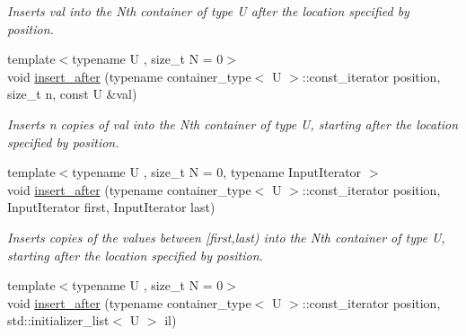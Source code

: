 \begin{DoxyCompactItemize}
\begin{DoxyCompactList}\small\item\em Inserts val into the Nth container of type U after the location specified by position. \end{DoxyCompactList}\item 
\hypertarget{classheterogeneous_1_1heteroforward__list_3_01_t_00_01_types_8_8_8_4_ae4b891f6c1e191cc7dd586497b12f716}{}{\footnotesize template$<$typename U , size\+\_\+t N = 0$>$ }\\void \hyperlink{classheterogeneous_1_1heteroforward__list_3_01_t_00_01_types_8_8_8_4_ae4b891f6c1e191cc7dd586497b12f716}{insert\+\_\+after} (typename container\+\_\+type$<$ U $>$\+::const\+\_\+iterator position, size\+\_\+t n, const U \&val)\label{classheterogeneous_1_1heteroforward__list_3_01_t_00_01_types_8_8_8_4_ae4b891f6c1e191cc7dd586497b12f716}

\begin{DoxyCompactList}\small\item\em Inserts n copies of val into the Nth container of type U, starting after the location specified by position. \end{DoxyCompactList}\item 
\hypertarget{classheterogeneous_1_1heteroforward__list_3_01_t_00_01_types_8_8_8_4_a1790f7a1290443893dd84bfc41457d74}{}{\footnotesize template$<$typename U , size\+\_\+t N = 0, typename Input\+Iterator $>$ }\\void \hyperlink{classheterogeneous_1_1heteroforward__list_3_01_t_00_01_types_8_8_8_4_a1790f7a1290443893dd84bfc41457d74}{insert\+\_\+after} (typename container\+\_\+type$<$ U $>$\+::const\+\_\+iterator position, Input\+Iterator first, Input\+Iterator last)\label{classheterogeneous_1_1heteroforward__list_3_01_t_00_01_types_8_8_8_4_a1790f7a1290443893dd84bfc41457d74}

\begin{DoxyCompactList}\small\item\em Inserts copies of the values between \mbox{[}first,last) into the Nth container of type U, starting after the location specified by position. \end{DoxyCompactList}\item 
\hypertarget{classheterogeneous_1_1heteroforward__list_3_01_t_00_01_types_8_8_8_4_a8360f342070c8329e02d3a143706d6f9}{}{\footnotesize template$<$typename U , size\+\_\+t N = 0$>$ }\\void \hyperlink{classheterogeneous_1_1heteroforward__list_3_01_t_00_01_types_8_8_8_4_a8360f342070c8329e02d3a143706d6f9}{insert\+\_\+after} (typename container\+\_\+type$<$ U $>$\+::const\+\_\+iterator position, std\+::initializer\+\_\+list$<$ U $>$ il)\label{classheterogeneous_1_1heteroforward__list_3_01_t_00_01_types_8_8_8_4_a8360f342070c8329e02d3a143706d6f9}


\end{DoxyCompactItemize}

